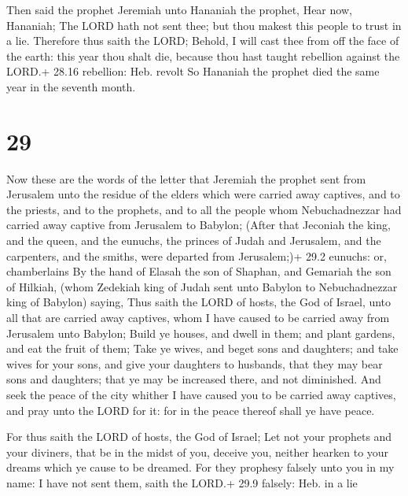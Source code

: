  Then said the prophet Jeremiah unto Hananiah the
prophet, Hear now, Hananiah; The LORD hath not sent thee; but thou
makest this people to trust in a lie.  Therefore thus saith
the LORD; Behold, I will cast thee from off the face of the earth: this
year thou shalt die, because thou hast taught rebellion against the
LORD.+ 28.16 rebellion: Heb. revolt  So Hananiah the
prophet died the same year in the seventh month.

\hypertarget{section-28}{%
\section{29}\label{section-28}}

 Now these are the words of the letter that Jeremiah the
prophet sent from Jerusalem unto the residue of the elders which were
carried away captives, and to the priests, and to the prophets, and to
all the people whom Nebuchadnezzar had carried away captive from
Jerusalem to Babylon;  (After that Jeconiah the king, and
the queen, and the eunuchs, the princes of Judah and Jerusalem, and the
carpenters, and the smiths, were departed from Jerusalem;)+ 29.2
eunuchs: or, chamberlains  By the hand of Elasah the son of
Shaphan, and Gemariah the son of Hilkiah, (whom Zedekiah king of Judah
sent unto Babylon to Nebuchadnezzar king of Babylon) saying,
 Thus saith the LORD of hosts, the God of Israel, unto all
that are carried away captives, whom I have caused to be carried away
from Jerusalem unto Babylon;  Build ye houses, and dwell in
them; and plant gardens, and eat the fruit of them;  Take ye
wives, and beget sons and daughters; and take wives for your sons, and
give your daughters to husbands, that they may bear sons and daughters;
that ye may be increased there, and not diminished.  And
seek the peace of the city whither I have caused you to be carried away
captives, and pray unto the LORD for it: for in the peace thereof shall
ye have peace.

 For thus saith the LORD of hosts, the God of Israel; Let
not your prophets and your diviners, that be in the midst of you,
deceive you, neither hearken to your dreams which ye cause to be
dreamed.  For they prophesy falsely unto you in my name: I
have not sent them, saith the LORD.+ 29.9 falsely: Heb. in a lie

